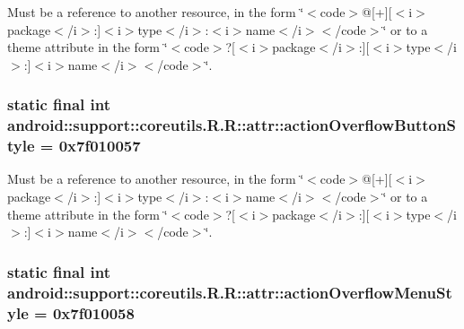Must be a reference to another resource, in the form \char`\"{}$<$code$>$@\mbox{[}+\mbox{]}\mbox{[}$<$i$>$package$<$/i$>$:\mbox{]}$<$i$>$type$<$/i$>$:$<$i$>$name$<$/i$>$$<$/code$>$\char`\"{} or to a theme attribute in the form \char`\"{}$<$code$>$?\mbox{[}$<$i$>$package$<$/i$>$:\mbox{]}\mbox{[}$<$i$>$type$<$/i$>$:\mbox{]}$<$i$>$name$<$/i$>$$<$/code$>$\char`\"{}. \hypertarget{classandroid_1_1support_1_1coreutils_1_1_r_1_1attr_3da536ac79b7692d2d7ba5cad75ac3b7}{
\subsubsection[{actionOverflowButtonStyle}]{\setlength{\rightskip}{0pt plus 5cm}static final int android::support::coreutils.R.R::attr::actionOverflowButtonStyle = 0x7f010057}}
\label{classandroid_1_1support_1_1coreutils_1_1_r_1_1attr_3da536ac79b7692d2d7ba5cad75ac3b7}


Must be a reference to another resource, in the form \char`\"{}$<$code$>$@\mbox{[}+\mbox{]}\mbox{[}$<$i$>$package$<$/i$>$:\mbox{]}$<$i$>$type$<$/i$>$:$<$i$>$name$<$/i$>$$<$/code$>$\char`\"{} or to a theme attribute in the form \char`\"{}$<$code$>$?\mbox{[}$<$i$>$package$<$/i$>$:\mbox{]}\mbox{[}$<$i$>$type$<$/i$>$:\mbox{]}$<$i$>$name$<$/i$>$$<$/code$>$\char`\"{}. \hypertarget{classandroid_1_1support_1_1coreutils_1_1_r_1_1attr_593268e51fa4f4270e43bdd94bc87a6d}{
\subsubsection[{actionOverflowMenuStyle}]{\setlength{\rightskip}{0pt plus 5cm}static final int android::support::coreutils.R.R::attr::actionOverflowMenuStyle = 0x7f010058}}
\label{classandroid_1_1support_1_1coreutils_1_1_r_1_1attr_593268e51fa4f4270e43bdd94bc87a6d}


